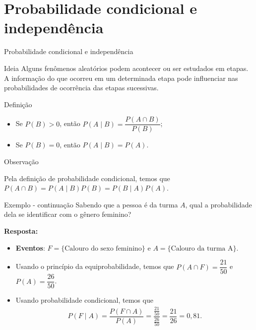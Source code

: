 \documentclass[9pt]{beamer}
\begin{document}
\section{Probabilidade condicional e independência}
\begin{frame}{Probabilidade condicional e independência}

{\small
\begin{block}{Ideia}
	Alguns fenômenos aleatórios podem acontecer ou ser estudados em etapas. A informação do que ocorreu em um determinada etapa pode influenciar nas probabilidades de ocorrência das etapas sucessivas.
\end{block}

\begin{block}{Definição}
	
	\begin{itemize}
		\item Se $P(B)>0$, então $P(A \mid B) = \dfrac{P(A \cap B)}{P(B)}$;
		\item Se $P(B)=0$, então $P(A \mid B) = P(A)$.
	\end{itemize}
\end{block}

\begin{block}{Observação}

Pela definição de probabilidade condicional, temos que 
		$P(A \cap B) = P(A \mid B) P(B) = P(B \mid A) P(A)$.

\end{block}
}
\end{frame}

\begin{frame}{Exemplo - continuação}
	Sabendo que a pessoa é da turma $A$, qual a probabilidade dela se identificar com o gênero feminino?
	\vfill
	
	\textbf{Resposta:} 
	\begin{itemize}
		\item \textbf{Eventos}: $F = \{\mbox{Calouro do sexo feminino}\}$ e $A=\{\mbox{Calouro da turma A}\}$.
		\item Usando o princípio da equiprobabilidade, temos que $P(A \cap F) = \dfrac{21}{50}$ e $P(A) = \dfrac{26}{50}$.
		\item Usando probabilidade condicional, temos que 
		\begin{align*}
		P(F \mid A) = \dfrac{P(F \cap A)}{P(A)} = \dfrac{\frac{21}{50}}{\frac{26}{50}} = \dfrac{21}{26} = 0,81.
		\end{align*}
	\end{itemize}
\end{frame}
\end{document}

